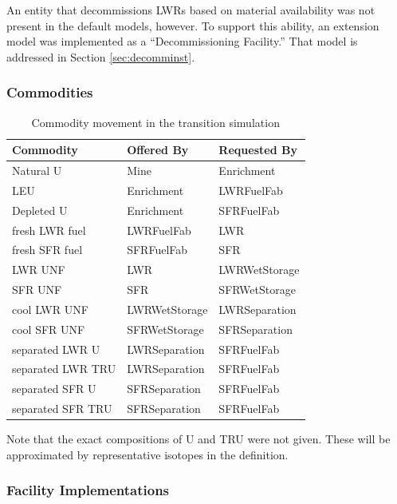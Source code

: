 An entity that decommissions LWRs based on material availability was not 
present in the default models, however. To support this ability, an extension 
model was implemented as a ``Decommissioning Facility.'' That model is 
addressed in Section \ref{sec:decomminst}.

\subsubsection{Commodities}

\begin{table}[htbp]
\centering
\begin{tabular}{|l|l|l|}
\hline
Commodity  &     Offered By  &    Requested By \\
\hline
Natural  U & Mine & Enrichment \\ 
LEU & Enrichment & LWRFuelFab \\ 
Depleted U & Enrichment & SFRFuelFab \\ 
fresh LWR fuel & LWRFuelFab & LWR \\ 
fresh SFR fuel & SFRFuelFab & SFR \\ 
LWR UNF & LWR & LWRWetStorage \\ 
SFR UNF & SFR & SFRWetStorage \\ 
cool LWR UNF & LWRWetStorage & LWRSeparation \\ 
cool SFR UNF & SFRWetStorage & SFRSeparation \\ 
separated LWR U & LWRSeparation & SFRFuelFab \\ 
separated LWR TRU & LWRSeparation & SFRFuelFab \\ 
separated SFR U & SFRSeparation & SFRFuelFab \\ 
separated SFR TRU & SFRSeparation & SFRFuelFab \\ 
\hline
\end{tabular}
\caption{Commodity movement in the transition simulation}
\label{tab:commods}
\end{table}

Note that the exact compositions of U and TRU were not given. These will be
approximated by representative isotopes in the \Cyclus definition.


\subsubsection{Facility Implementations}

